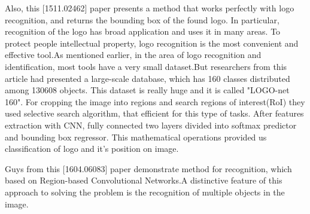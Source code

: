 \vspace{-0.3cm}

\par Also, this [1511.02462] paper presents a method that works perfectly with logo recognition, and returns the bounding box of the found logo. In particular, recognition of the logo has broad application and uses it in many areas. To protect people intellectual property, logo recognition is the most convenient and effective tool.As mentioned earlier, in the area of logo recognition and identification, most tools have a very small dataset.But researchers from this article had presented a large-scale database, which has 160 classes distributed among 130608 objects. This dataset is really huge and it is called "LOGO-net 160". For cropping the image into regions and search regions of interest(RoI) they used selective search algorithm, that efficient for this type of tasks. After features extraction with CNN, fully connected two layers divided into softmax predictor and bounding box regressor. This mathematical operations provided us classification of logo and it's position on image.



\vspace{-0.3cm}

\par Guys from this [1604.06083] paper demonstrate method for recognition, which based on Region-based Convolutional Networks.A distinctive feature of this approach to solving the problem is the recognition of multiple objects in the image.

\vspace{-0.5cm}
